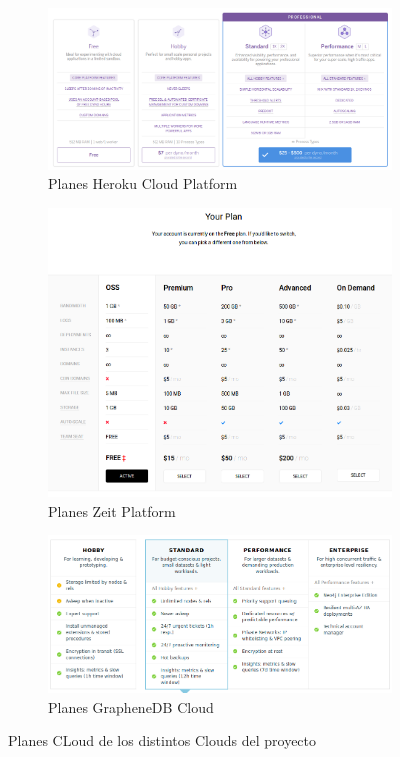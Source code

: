 \begin{figure}[hbtp] \centering
\begin{subfigure}{.6\textwidth}
    \includegraphics[width=\linewidth]{figuras/heroku-plan.png}
    \caption{Planes Heroku Cloud Platform}
    \label{fig::PlanesHerokuCloudPlatform}
\end{subfigure}

\begin{subfigure}{.6\textwidth}
    \includegraphics[width=\linewidth]{figuras/zeit-plan.png}
    \caption{Planes Zeit Platform}
    \label{fig::PlanesZeitPlatform}
\end{subfigure}

\begin{subfigure}{.6\textwidth}
    \includegraphics[width=\linewidth]{figuras/graphenedb-plan.png}
    \caption{Planes GrapheneDB Cloud} 
    \label{fig::PlanesGrapheneDBCloud}
\end{subfigure}
\caption{Planes CLoud de los distintos Clouds del proyecto}
\label{fig::costes}
\end{figure}

